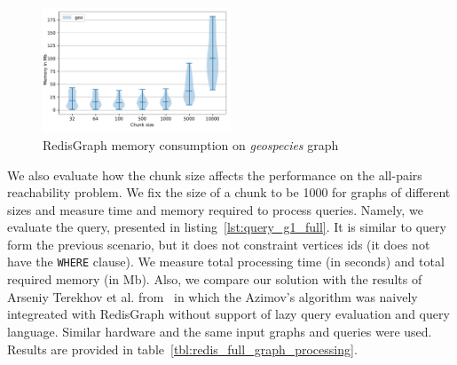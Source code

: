 \begin{figure}[h]
\centering
\includegraphics[width=0.5\textwidth]{data/raw_memory/geospecies.pdf}
\caption{RedisGraph memory consumption on \textit{geospecies} graph}
\label{fig:redis_memory_geospecies}
\end{figure}


\begin{algorithm}
\end{algorithm}

We also evaluate how the chunk size affects the performance on the all-pairs reachability problem.
We fix the size of a chunk to be 1000 for graphs of different sizes and measure time and memory required to process queries.
Namely, we evaluate the query, presented in listing~\ref{lst:query_g1_full}.
It is similar to query form the previous scenario, but it does not constraint  vertices ids (it does not have the \texttt{WHERE} clause).
We measure total processing time (in seconds) and total required memory (in Mb).
Also, we compare our solution with the results of Arseniy Terekhov et al. from~\cite{10.1145/3398682.3399163} in which the Azimov's algorithm was naively integreated with RedisGraph without support of lazy query evaluation and query language.
Similar hardware and the same input graphs and queries were used.
Results are provided in table~\ref{tbl:redis_full_graph_processing}.

